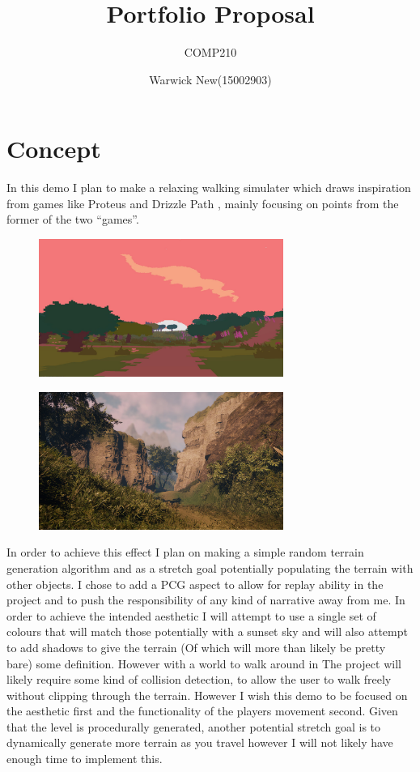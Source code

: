 \documentclass{scrartcl}
\title{Portfolio Proposal}
\subtitle{COMP210}
\author{Warwick New(15002903)}
\begin{document}
\maketitle

\section*{Concept}
In this demo I plan to make  a relaxing walking simulater which draws inspiration from games like Proteus \cite{proteus} and Drizzle Path \cite{drizzlepath}, mainly focusing on points from the former of the two ``games''.

\begin{figure}[h]
	\includegraphics[width=8cm]{Proteus}
	\centering
\end{figure}

\begin{figure}[h]
	\includegraphics[width=8cm]{DrizzlePath}
	\centering
\end{figure}

In order to achieve this effect I plan on making a simple random terrain generation algorithm and as a stretch goal potentially populating the terrain with other objects. I chose to add a PCG aspect to allow for replay ability in the project and to push the responsibility of any kind of narrative away from me. In order to achieve the intended aesthetic I will attempt to use a single set of colours that will match those potentially with a sunset sky and will also attempt to add shadows to give the terrain (Of which will more than likely be pretty bare) some definition. However with a world to walk around in The project will likely require some kind of collision detection, to allow the user to walk freely without clipping through the terrain. However I wish this demo to be focused on the aesthetic first and the functionality of the players movement second. Given that the level is procedurally generated, another potential stretch goal is to dynamically generate more terrain as you travel however I will not likely have enough time to implement this.
\end{document}
